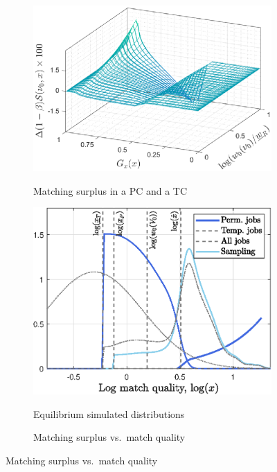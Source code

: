 \documentclass[12pt,letterpaper]{article} %
\theoremstyle{plain}
\theoremstyle{definition}
\begin{document}
	\begin{figure}[!h]
		\centering
		\begin{subfigure}{0.495\textwidth}
			\centering
			\caption{Matching surplus in a PC and a TC}
			\includegraphics[width=\textwidth]{panel_a.eps}
			\label{fig:panel_a}
		\end{subfigure}
		\begin{subfigure}{0.445\textwidth}
			\centering
			\caption{Equilibrium simulated distributions}
			\includegraphics[width=\textwidth]{panel_b.eps}
			\label{fig:panel_d}
		\end{subfigure}
		\begin{subfigure}{0.475\textwidth}
			\centering
			\caption{Matching surplus vs.\ match quality}

\end{subfigure}
\end{figure}
\end{document}
